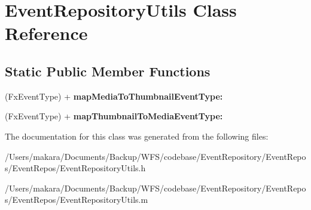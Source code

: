 \hypertarget{interface_event_repository_utils}{
\section{\-Event\-Repository\-Utils \-Class \-Reference}
\label{interface_event_repository_utils}
}
\subsection*{\-Static \-Public \-Member \-Functions}
\begin{DoxyCompactItemize}
\item 
\hypertarget{interface_event_repository_utils_a33e121c13289ea10e6139859937541ab}{
(\-Fx\-Event\-Type) + {\bfseries map\-Media\-To\-Thumbnail\-Event\-Type\-:}}
\label{interface_event_repository_utils_a33e121c13289ea10e6139859937541ab}

\item 
\hypertarget{interface_event_repository_utils_a75431e1e390b54cf93bf8f631cddfa97}{
(\-Fx\-Event\-Type) + {\bfseries map\-Thumbnail\-To\-Media\-Event\-Type\-:}}
\label{interface_event_repository_utils_a75431e1e390b54cf93bf8f631cddfa97}

\end{DoxyCompactItemize}


\-The documentation for this class was generated from the following files\-:\begin{DoxyCompactItemize}
\item 
/\-Users/makara/\-Documents/\-Backup/\-W\-F\-S/codebase/\-Event\-Repository/\-Event\-Repos/\-Event\-Repos/\-Event\-Repository\-Utils.\-h\item 
/\-Users/makara/\-Documents/\-Backup/\-W\-F\-S/codebase/\-Event\-Repository/\-Event\-Repos/\-Event\-Repos/\-Event\-Repository\-Utils.\-m\end{DoxyCompactItemize}
